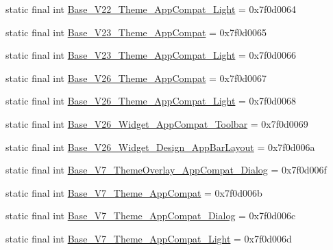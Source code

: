 \begin{DoxyCompactItemize}
\item 
static final int \mbox{\hyperlink{classandroid_1_1support_1_1design_1_1R_1_1style_abd60acce4aabee6976bca2367aa5772c}{Base\+\_\+\+V22\+\_\+\+Theme\+\_\+\+App\+Compat\+\_\+\+Light}} = 0x7f0d0064
\item 
static final int \mbox{\hyperlink{classandroid_1_1support_1_1design_1_1R_1_1style_a51ae26e7db14e3694ad3a1407c77696c}{Base\+\_\+\+V23\+\_\+\+Theme\+\_\+\+App\+Compat}} = 0x7f0d0065
\item 
static final int \mbox{\hyperlink{classandroid_1_1support_1_1design_1_1R_1_1style_a590015dcac5ee7ee1c7f82e7db386a8f}{Base\+\_\+\+V23\+\_\+\+Theme\+\_\+\+App\+Compat\+\_\+\+Light}} = 0x7f0d0066
\item 
static final int \mbox{\hyperlink{classandroid_1_1support_1_1design_1_1R_1_1style_a09704c0df33345e12308b906d1972a60}{Base\+\_\+\+V26\+\_\+\+Theme\+\_\+\+App\+Compat}} = 0x7f0d0067
\item 
static final int \mbox{\hyperlink{classandroid_1_1support_1_1design_1_1R_1_1style_a6c4cf900dd54a5d45948d4dc180ec73a}{Base\+\_\+\+V26\+\_\+\+Theme\+\_\+\+App\+Compat\+\_\+\+Light}} = 0x7f0d0068
\item 
static final int \mbox{\hyperlink{classandroid_1_1support_1_1design_1_1R_1_1style_a9714c5b36503280ef8afb4f77d2f0358}{Base\+\_\+\+V26\+\_\+\+Widget\+\_\+\+App\+Compat\+\_\+\+Toolbar}} = 0x7f0d0069
\item 
static final int \mbox{\hyperlink{classandroid_1_1support_1_1design_1_1R_1_1style_a888ffd10214b01ef0030b8012ca65b10}{Base\+\_\+\+V26\+\_\+\+Widget\+\_\+\+Design\+\_\+\+App\+Bar\+Layout}} = 0x7f0d006a
\item 
static final int \mbox{\hyperlink{classandroid_1_1support_1_1design_1_1R_1_1style_a5366aa427cc00f440950911dbcabd35d}{Base\+\_\+\+V7\+\_\+\+Theme\+Overlay\+\_\+\+App\+Compat\+\_\+\+Dialog}} = 0x7f0d006f
\item 
static final int \mbox{\hyperlink{classandroid_1_1support_1_1design_1_1R_1_1style_ac307f81dfe0e14e01c0963d9cd722432}{Base\+\_\+\+V7\+\_\+\+Theme\+\_\+\+App\+Compat}} = 0x7f0d006b
\item 
static final int \mbox{\hyperlink{classandroid_1_1support_1_1design_1_1R_1_1style_a31a92314ed1ac7dbe3564f1d79411770}{Base\+\_\+\+V7\+\_\+\+Theme\+\_\+\+App\+Compat\+\_\+\+Dialog}} = 0x7f0d006c
\item 
static final int \mbox{\hyperlink{classandroid_1_1support_1_1design_1_1R_1_1style_abe04237f3a2ce7821478da9f45a9dff7}{Base\+\_\+\+V7\+\_\+\+Theme\+\_\+\+App\+Compat\+\_\+\+Light}} = 0x7f0d006d

\end{DoxyCompactItemize}
